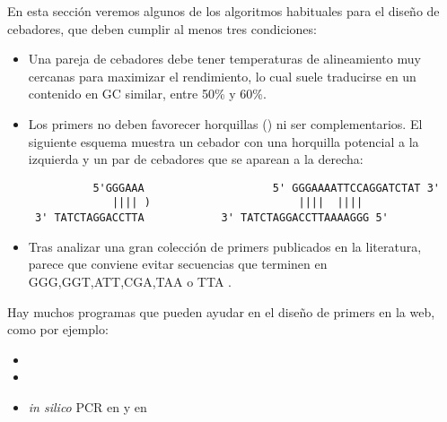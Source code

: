 En esta secci\'{o}n veremos algunos de los algoritmos habituales para el dise\~no de cebadores, 
que deben cumplir al menos tres condiciones: 



\begin{itemize} \label{reqprimers}
\item Una pareja de cebadores debe tener temperaturas de alineamiento muy cercanas para maximizar el rendimiento, 
lo cual suele traducirse en un contenido en GC similar, entre 50\% y 60\%. 
\item Los primers no deben favorecer horquillas () ni ser complementarios. 
El siguiente esquema muestra un cebador con una horquilla potencial a la izquierda y un par de cebadores que se aparean a la derecha:
\begin{verbatim}
          5'GGGAAA                    5' GGGAAAATTCCAGGATCTAT 3'
             |||| )                       ||||  ||||
 3' TATCTAGGACCTTA            3' TATCTAGGACCTTAAAAGGG 5'     
\end{verbatim}
\item Tras analizar una gran colecci\'{o}n de primers publicados en la literatura, parece que conviene evitar secuencias 
que terminen en GGG,GGT,ATT,CGA,TAA o TTA \citep{Onodera2007}.
\end{itemize}

Hay muchos programas que pueden ayudar en el dise\~no de primers en la web, como por ejemplo:
\begin{itemize}
\item {}
\item {}
\item \emph{in silico} PCR en  
	y en  
\end{itemize}

